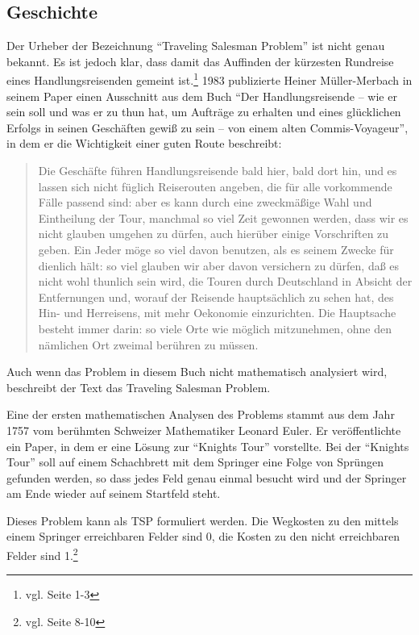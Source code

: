 \documentclass[11pt,a4paper]{article}
\begin{document}
\subsection{Geschichte}
Der Urheber der Bezeichnung "`Traveling Salesman Problem"' ist nicht genau bekannt. Es ist jedoch klar, dass damit das Auffinden der kürzesten Rundreise eines Handlungsreisenden gemeint ist.\footnote{vgl. \cite{applegate06} Seite 1-3} 1983 publizierte Heiner Müller-Merbach in seinem Paper\cite{mueller83} einen Ausschnitt aus dem Buch "`Der Handlungsreisende – wie er sein soll und was er zu thun hat, um Aufträge zu erhalten und eines glücklichen Erfolgs in seinen Geschäften gewiß zu sein – von einem alten Commis-Voyageur"', in dem er die Wichtigkeit einer guten Route beschreibt:  
\begin{quotation}
Die Geschäfte führen Handlungsreisende bald hier, bald dort hin, und es lassen sich nicht füglich Reiserouten angeben, die für alle vorkommende Fälle passend sind: aber es kann durch eine zweckmäßige Wahl und Eintheilung der Tour, manchmal so viel Zeit gewonnen werden, dass wir es nicht glauben umgehen zu dürfen, auch hierüber einige Vorschriften zu geben. Ein Jeder möge so viel davon benutzen, als es seinem Zwecke für dienlich hält: so viel glauben wir aber davon versichern zu dürfen, daß es nicht wohl thunlich sein wird, die Touren durch Deutschland in Absicht der Entfernungen und, worauf der Reisende hauptsächlich zu sehen hat, des Hin- und Herreisens, mit mehr Oekonomie einzurichten. Die Hauptsache besteht immer darin: so viele Orte wie möglich mitzunehmen, ohne den nämlichen Ort zweimal berühren zu müssen.
\end{quotation}

Auch wenn das Problem in diesem Buch nicht mathematisch analysiert wird, beschreibt der Text das Traveling Salesman Problem. 

Eine der ersten mathematischen Analysen des Problems stammt aus dem Jahr 1757 vom berühmten Schweizer Mathematiker Leonard Euler. Er veröffentlichte ein Paper, in dem er eine Lösung zur "`Knights Tour"' vorstellte. Bei der "`Knights Tour"' soll auf einem Schachbrett mit dem Springer eine Folge von Sprüngen gefunden werden, so dass jedes Feld genau einmal besucht wird und der Springer am Ende wieder auf seinem Startfeld steht.

Dieses Problem kann als TSP formuliert werden. Die Wegkosten zu den mittels einem Springer erreichbaren Felder sind 0, die Kosten zu den nicht erreichbaren Felder sind 1.\footnote{vgl. \cite{applegate06} Seite 8-10}
\end{document}
